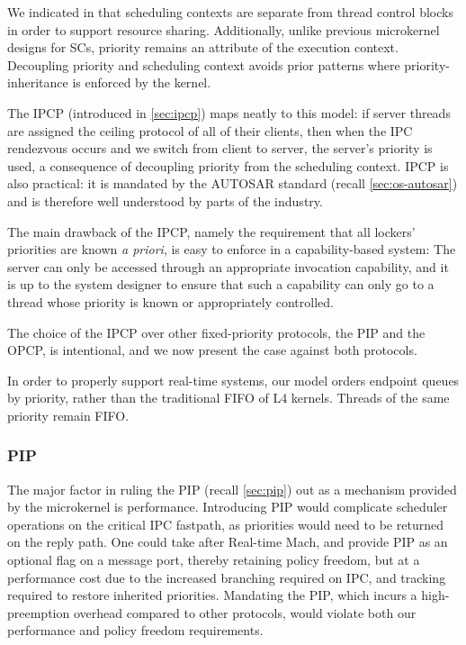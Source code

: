 We indicated in  that scheduling contexts are separate from thread control blocks in
order to support resource sharing. Additionally, unlike previous microkernel designs for \glspl{SC}, priority
remains an attribute of the execution context. Decoupling priority and scheduling context avoids
prior patterns where priority-inheritance is enforced by the kernel. 

The \Gls{IPCP} (introduced in \cref{sec:ipcp}) maps neatly to this model: if server threads are assigned the ceiling protocol of all of
their clients, then when the \gls{IPC} rendezvous occurs and we switch from client to server, the
server's priority is used, a consequence of decoupling priority from the scheduling context.
\gls{IPCP} is also practical: it is mandated by the AUTOSAR standard
(recall \cref{sec:os-autosar}) and is therefore well understood by parts of the industry.

The main drawback of the \gls{IPCP}, namely the requirement that all
lockers' priorities are known \emph{a priori}, is easy to enforce in a
capability-based system: The server can only be accessed through an
appropriate invocation capability, and it is up to the system designer
to ensure that such a capability can only go to a thread whose
priority is known or appropriately controlled.

The choice of the \gls{IPCP} over other fixed-priority protocols, the \gls{PIP} and the \gls{OPCP},
is intentional, and we now present the case against both protocols.

In order to properly support real-time systems, our model orders endpoint queues by priority, rather
than the traditional \gls{FIFO} of L4 kernels. Threads of the same priority remain FIFO. 

\subsubsection{\gls{PIP}}

The major factor in ruling the \gls{PIP} (recall \cref{sec:pip}) out as a mechanism provided by the microkernel is
performance. Introducing \gls{PIP} would complicate scheduler operations on the critical
\gls{IPC} fastpath, as priorities would need to be returned on the reply path. One could take after
Real-time Mach, and provide \gls{PIP} as an optional flag on a message port, thereby retaining
policy freedom, but at a performance cost due to the increased branching required on \gls{IPC}, and
tracking required to restore inherited priorities. Mandating the \gls{PIP}, which incurs a high-preemption
overhead compared to other protocols, would violate both our performance and policy freedom
requirements. 

